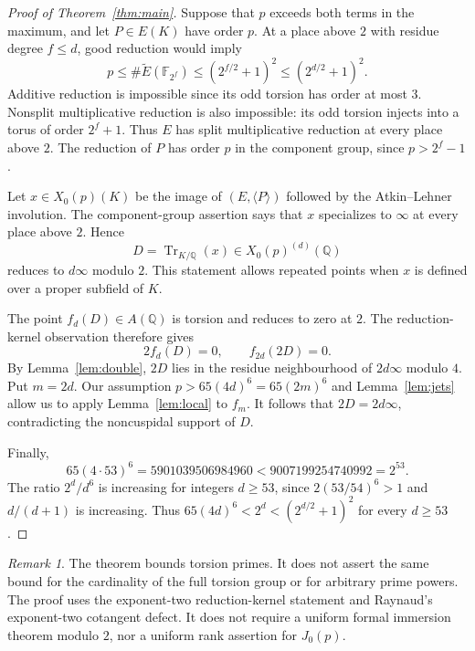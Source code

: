 \documentclass[11pt]{article}
\theoremstyle{remark}\newtheorem{remark}[theorem]{Remark}
\newcommand{\Q}{\mathbb Q}\newcommand{\Z}{\mathbb Z}
\newcommand{\F}{\mathbb F}\newcommand{\T}{\mathbb T}
\DeclareMathOperator{\Tr}{Tr}
\begin{document}
\begin{proof}[Proof of Theorem~\ref{thm:main}]
Suppose that $p$ exceeds both terms in the maximum, and let
$P\in E(K)$ have order $p$.
At a place above $2$ with residue degree $f\leq d$, good reduction
would imply
\[
 p\leq\#\widetilde E(\F_{2^f})\leq(2^{f/2}+1)^2
 \leq(2^{d/2}+1)^2.
\]
Additive reduction is impossible since its odd torsion has order at most $3$.
Nonsplit multiplicative reduction is also impossible: its odd torsion
injects into a torus of order $2^f+1$.
Thus $E$ has split multiplicative reduction at every place above $2$.
The reduction of $P$ has order $p$ in the component group, since
$p>2^f-1$.

Let $x\in X_0(p)(K)$ be the image of $(E,\langle P\rangle)$ followed
by the Atkin--Lehner involution. The component-group assertion says
that $x$ specializes to $\infty$ at every place above $2$.
Hence
\[
 D=\Tr_{K/\Q}(x)\in X_0(p)^{(d)}(\Q)
\]
reduces to $d\infty$ modulo $2$. This statement allows repeated
points when $x$ is defined over a proper subfield of $K$.

The point $f_d(D)\in A(\Q)$ is torsion and reduces to zero at $2$.
The reduction-kernel observation therefore gives
\[
 2f_d(D)=0,\qquad f_{2d}(2D)=0.
\]
By Lemma~\ref{lem:double}, $2D$ lies in the residue neighbourhood
of $2d\infty$ modulo $4$.
Put $m=2d$. Our assumption $p>65(4d)^6=65(2m)^6$ and
Lemma~\ref{lem:jets} allow us to apply Lemma~\ref{lem:local} to $f_m$.
It follows that $2D=2d\infty$, contradicting the noncuspidal support of $D$.

Finally,
\[
 65(4\cdot53)^6=5901039506984960<9007199254740992=2^{53}.
\]
The ratio $2^d/d^6$ is increasing for integers $d\geq53$, since
$2(53/54)^6>1$ and $d/(d+1)$ is increasing.
Thus $65(4d)^6<2^d<(2^{d/2}+1)^2$ for every $d\geq53$.
\end{proof}

\begin{remark}
The theorem bounds torsion primes. It does not assert the same bound
for the cardinality of the full torsion group or for arbitrary prime powers.
The proof uses the exponent-two reduction-kernel statement and Raynaud's
exponent-two cotangent defect. It does not require a uniform formal
immersion theorem modulo $2$, nor a uniform rank assertion for $J_0(p)$.
\end{remark}
\end{document}
